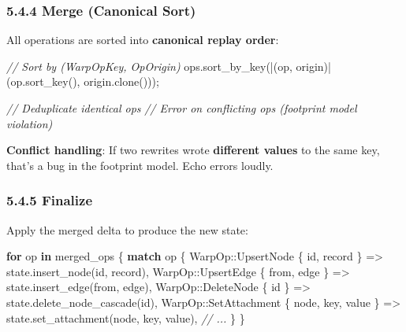 \documentclass[
  11pt,
]{book}
\newenvironment{Shaded}{}{}
\newcommand{\CommentTok}[1]{\textcolor[rgb]{0.38,0.63,0.69}{\textit{#1}}}
\newcommand{\ControlFlowTok}[1]{\textcolor[rgb]{0.00,0.44,0.13}{\textbf{#1}}}
\newcommand{\KeywordTok}[1]{\textcolor[rgb]{0.00,0.44,0.13}{\textbf{#1}}}
\newcommand{\NormalTok}[1]{#1}
\newcommand{\OperatorTok}[1]{\textcolor[rgb]{0.40,0.40,0.40}{#1}}
\newcommand{\PreprocessorTok}[1]{\textcolor[rgb]{0.74,0.48,0.00}{#1}}
\begin{document}
\subsubsection{5.4.4 Merge (Canonical Sort)}\label{merge-canonical-sort}

All operations are sorted into \textbf{canonical replay order}:

\begin{Shaded}
\begin{Highlighting}[]
\CommentTok{// Sort by (WarpOpKey, OpOrigin)}
\NormalTok{ops}\OperatorTok{.}\NormalTok{sort\_by\_key(}\OperatorTok{|}\NormalTok{(op}\OperatorTok{,}\NormalTok{ origin)}\OperatorTok{|}\NormalTok{ (op}\OperatorTok{.}\NormalTok{sort\_key()}\OperatorTok{,}\NormalTok{ origin}\OperatorTok{.}\NormalTok{clone()))}\OperatorTok{;}

\CommentTok{// Deduplicate identical ops}
\CommentTok{// Error on conflicting ops (footprint model violation)}
\end{Highlighting}
\end{Shaded}

\textbf{Conflict handling}: If two rewrites wrote \textbf{different
values} to the same key, that's a bug in the footprint model. Echo
errors loudly.

\subsubsection{5.4.5 Finalize}\label{finalize}

Apply the merged delta to produce the new state:

\begin{Shaded}
\begin{Highlighting}[]
\ControlFlowTok{for}\NormalTok{ op }\KeywordTok{in}\NormalTok{ merged\_ops }\OperatorTok{\{}
    \ControlFlowTok{match}\NormalTok{ op }\OperatorTok{\{}
        \PreprocessorTok{WarpOp::}\NormalTok{UpsertNode }\OperatorTok{\{}\NormalTok{ id}\OperatorTok{,}\NormalTok{ record }\OperatorTok{\}} \OperatorTok{=\textgreater{}}\NormalTok{ state}\OperatorTok{.}\NormalTok{insert\_node(id}\OperatorTok{,}\NormalTok{ record)}\OperatorTok{,}
        \PreprocessorTok{WarpOp::}\NormalTok{UpsertEdge }\OperatorTok{\{}\NormalTok{ from}\OperatorTok{,}\NormalTok{ edge }\OperatorTok{\}} \OperatorTok{=\textgreater{}}\NormalTok{ state}\OperatorTok{.}\NormalTok{insert\_edge(from}\OperatorTok{,}\NormalTok{ edge)}\OperatorTok{,}
        \PreprocessorTok{WarpOp::}\NormalTok{DeleteNode }\OperatorTok{\{}\NormalTok{ id }\OperatorTok{\}} \OperatorTok{=\textgreater{}}\NormalTok{ state}\OperatorTok{.}\NormalTok{delete\_node\_cascade(id)}\OperatorTok{,}
        \PreprocessorTok{WarpOp::}\NormalTok{SetAttachment }\OperatorTok{\{}\NormalTok{ node}\OperatorTok{,}\NormalTok{ key}\OperatorTok{,}\NormalTok{ value }\OperatorTok{\}} \OperatorTok{=\textgreater{}}\NormalTok{ state}\OperatorTok{.}\NormalTok{set\_attachment(node}\OperatorTok{,}\NormalTok{ key}\OperatorTok{,}\NormalTok{ value)}\OperatorTok{,}
        \CommentTok{// ...}
    \OperatorTok{\}}
\OperatorTok{\}}
\end{Highlighting}
\end{Shaded}
\end{document}

